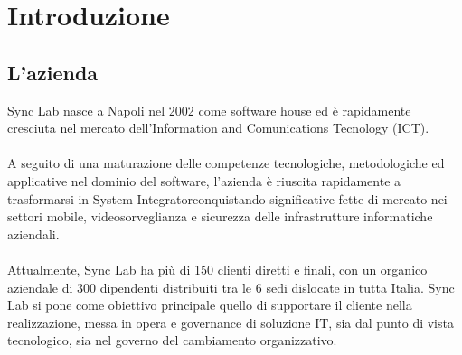 
\chapter{Introduzione}
\label{cap:introduzione}





\section{L'azienda}
Sync Lab nasce a Napoli nel 2002 come software house ed è rapidamente cresciuta nel
mercato dell’Information and Comunications Tecnology (ICT). 
\\\\
A seguito di una
maturazione delle competenze tecnologiche, metodologiche ed applicative nel dominio
del software, l’azienda è riuscita rapidamente a trasformarsi in \gls{System Integrator}\glsfirstoccur conquistando 
significative fette di mercato nei settori mobile, videosorveglianza e sicurezza
delle infrastrutture informatiche aziendali. 
\\\\
Attualmente, Sync Lab ha più di 150 clienti
diretti e finali, con un organico aziendale di 300 dipendenti distribuiti tra le 6 sedi
dislocate in tutta Italia.
Sync Lab si pone come obiettivo principale quello di supportare il cliente nella realizzazione, 
messa in opera e governance di soluzione \gls{IT}\glsfirstoccur, sia dal punto di vista tecnologico,
sia nel governo del cambiamento organizzativo.

